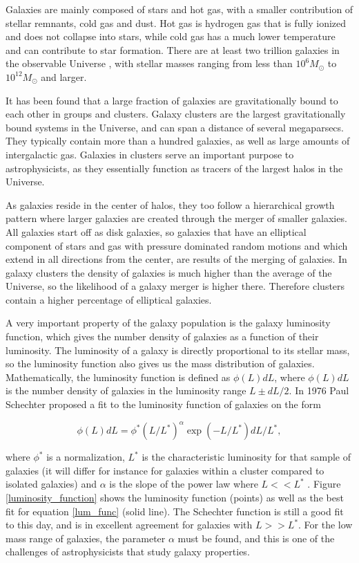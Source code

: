 Galaxies are mainly composed of stars and hot gas, with a smaller contribution of stellar remnants, cold gas and dust. Hot gas is hydrogen gas that is fully ionized and does not collapse into stars, while cold gas has a much lower temperature and can contribute to star formation. There are at least two trillion galaxies in the observable Universe \parencite{Conselice2016}, with stellar masses ranging from less than $10^6 M_{\odot}$ to $10^{12} M_{\odot}$ and larger. 

It has been found that a large fraction of galaxies are gravitationally bound to each other in groups and clusters.
Galaxy clusters are the largest gravitationally bound systems in the Universe, and can span a distance of several megaparsecs. They typically contain more than a hundred galaxies, as well as large amounts of intergalactic gas. Galaxies in clusters serve an important purpose to astrophysicists, as they essentially function as tracers of the largest halos in the Universe.

As galaxies reside in the center of halos, they too follow a hierarchical growth pattern where larger galaxies are created through the merger of smaller galaxies. All galaxies start off as disk galaxies, so galaxies that have an elliptical component of stars and gas with pressure dominated random motions and which extend in all directions from the center, are results of the merging of galaxies. In galaxy clusters the density of galaxies is much higher than the average of the Universe, so the likelihood of a galaxy merger is higher there. Therefore clusters contain a higher percentage of elliptical galaxies.

A very important property of the galaxy population is the galaxy luminosity function, which gives the number density of galaxies as a function of their luminosity. The luminosity of a galaxy is directly proportional to its stellar mass, so the luminosity function also gives us the mass distribution of galaxies. Mathematically, the luminosity function is defined as $\phi(L)dL$, where $\phi(L)dL$ is the number density of galaxies in the luminosity range $L \pm dL/2$. In 1976 Paul Schechter proposed a fit to the luminosity function of galaxies on the form

\begin{equation} \label{lum_func}
    \phi(L)dL = \phi^*(L/L^*)^{\alpha}\exp{(-L/L^*)}dL/L^*,
\end{equation}

where $\phi^*$ is a normalization, $L^*$ is the characteristic luminosity for that sample of galaxies (it will differ for instance for galaxies within a cluster compared to isolated galaxies) and $\alpha$ is the slope of the power law where $L<<L^*$ \parencite{Schechter1976}. Figure \ref{luminosity_function} shows the luminosity function (points) as well as the best fit for equation \ref{lum_func} (solid line). The Schechter function is still a good fit to this day, and is in excellent agreement for galaxies with $L>>L^*$. For the low mass range of galaxies, the parameter $\alpha$ must be found, and this is one of the challenges of astrophysicists that study galaxy properties.

